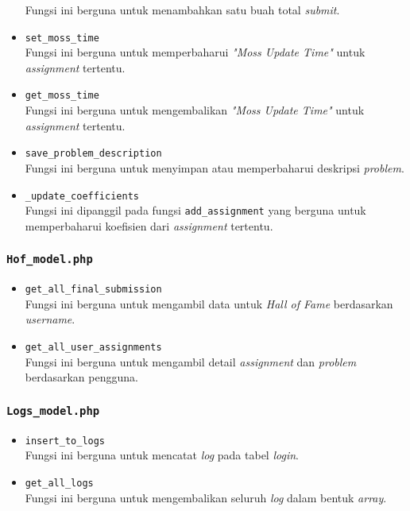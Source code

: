 \begin{itemize}
	Fungsi ini berguna untuk menambahkan satu buah total \textit{submit}.
	\item \texttt{set\_moss\_time}\\
	Fungsi ini berguna untuk memperbaharui \textit{"Moss Update Time"} untuk \textit{assignment} tertentu.
	\item \texttt{get\_moss\_time}\\
	Fungsi ini berguna untuk mengembalikan \textit{"Moss Update Time"} untuk \textit{assignment} tertentu.
	\item \texttt{save\_problem\_description}\\
	Fungsi ini berguna untuk menyimpan atau memperbaharui deskripsi \textit{problem}.
	\item \texttt{\_update\_coefficients}\\
	Fungsi ini dipanggil pada fungsi \texttt{add\_assignment} yang berguna untuk memperbaharui koefisien dari \textit{assignment} tertentu.
\end{itemize}
\subsubsection{\texttt{Hof\_model.php}}
\begin{itemize}
	\item \texttt{get\_all\_final\_submission}\\
	Fungsi ini berguna untuk mengambil data untuk \textit{Hall of Fame} berdasarkan \textit{username}.
	\item \texttt{get\_all\_user\_assignments}\\
	Fungsi ini berguna untuk mengambil detail \textit{assignment} dan \textit{problem} berdasarkan pengguna.
\end{itemize}
\subsubsection{\texttt{Logs\_model.php}}
\begin{itemize}
	\item \texttt{insert\_to\_logs}\\
	Fungsi ini berguna untuk mencatat \textit{log} pada tabel \textit{login}.
	\item \texttt{get\_all\_logs}\\
	Fungsi ini berguna untuk mengembalikan seluruh \textit{log} dalam bentuk \textit{array}.
\end{itemize}

